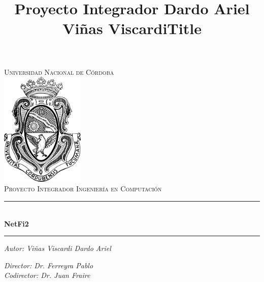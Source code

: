 \documentclass[a4paper,openright,12pt]{report}
\title{Proyecto Integrador Dardo Ariel Viñas Viscardi}
\begin{document}

\begin{titlepage}
\begin{center}

\textsc{Universidad Nacional de Córdoba}\\[1.5cm] %

\includegraphics[width=0.3\textwidth]{img/logo_unc.pdf}~\\[1cm]

\textsc{\Large Proyecto Integrador Ingeniería en Computación }\\[0.5cm] %

\rule{1.5\textwidth}{.4pt} %
\title{Title }\\[0.4cm] %
\textbf{\Huge{NetFi2}}
\rule{1.5\textwidth}{.4pt} %
 
\begin{minipage}{0.4\textwidth}
\begin{flushleft} \large
\emph{Autor: Viñas Viscardi Dardo Ariel}\\


\end{flushleft}
\end{minipage}
\begin{minipage}{0.4\textwidth}
\begin{flushright} \large
\emph{Director: Dr. Ferreyra Pablo} \\
\emph{Codirector: Dr. Juan Fraire} \\
 
\end{flushright}
\end{minipage}\\[1cm]

\begin{table}[H]
\centering
\label{my-label}


\end{table}
\end{center}
\end{titlepage}
\end{document}
